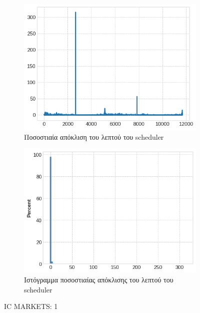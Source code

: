 \documentclass[12pt, a4paper]{article}
\begin{document}
\begin{figure}[h!]
  \begin{subfigure}[b]{0.45\textwidth}
    \centering
    \includegraphics[width=\textwidth]{delay_candlestick_line_icm.png}
    \caption{Ποσοστιαία απόκλιση του λεπτού του scheduler}
    \label{fig:sub3}
  \end{subfigure}
  \hfill
  \begin{subfigure}[b]{0.45\textwidth}
    \centering
    \includegraphics[width=\textwidth]{delay_candlestick_hist_icm.png}
    \caption{Ιστόγραμμα ποσοστιαίας απόκλισης του λεπτού του scheduler}
  \end{subfigure}
  
  \caption{IC MARKETS: 1}
\end{figure}

\clearpage
\end{document}

